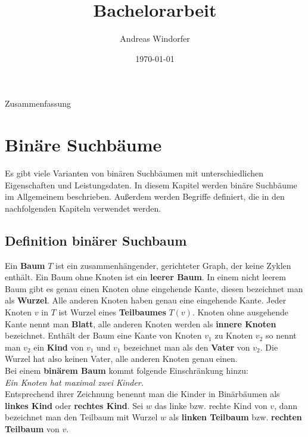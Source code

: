 \documentclass[a4paper,12pt]{article}
\title{Bachelorarbeit}
\author{

	Andreas Windorfer\\
}
\date{\today}
\begin{document}
\maketitle
\newpage
Zusammenfassung
\newpage
\tableofcontents


\newpage


\section {Binäre Suchbäume}
Es gibt viele Varianten von binären Suchbäumen mit unterschiedlichen Eigenschaften und Leistungsdaten. In diesem Kapitel werden binäre Suchbäume im Allgemeinem beschrieben. Außerdem werden Begriffe definiert, die in den nachfolgenden Kapiteln verwendet werden. \\
\subsection{Definition binärer Suchbaum}
Ein \textbf{Baum} $T$ ist ein zusammenhängender, gerichteter Graph, der keine Zyklen enthält. Ein Baum ohne Knoten ist ein \textbf{leerer Baum}. In einem nicht leerem Baum gibt es genau einen Knoten ohne eingehende Kante, diesen bezeichnet man als \textbf{Wurzel}. Alle anderen Knoten haben genau eine eingehende Kante. Jeder Knoten $v$ in $T$ ist Wurzel eines \textbf{Teilbaumes} $T(v)$. Knoten ohne ausgehende Kante nennt man \textbf{Blatt}, alle anderen Knoten werden als \textbf{innere Knoten} bezeichnet. Enthält der Baum eine Kante von Knoten $v_1$ zu Knoten $v_2$ so nennt man $v_2$ ein \textbf{Kind} von $v_1$ und $v_1$ bezeichnet man als den  \textbf{Vater} von $v_2$. Die Wurzel hat also keinen Vater, alle anderen Knoten genau einen.\\
Bei einem \textbf{binärem Baum} kommt folgende Einschränkung hinzu:  \\
\textit{Ein Knoten hat maximal zwei Kinder.}\\ 
Entsprechend ihrer Zeichnung benennt man die Kinder in Binärbäumen als \textbf{linkes Kind} oder \textbf{rechtes Kind}. Sei $w$ das linke bzw. rechte Kind von $v$, dann bezeichnet man den Teilbaum mit Wurzel $w$ als \textbf{linken Teilbaum} bzw. \textbf{rechten Teilbaum}  von $v$.  
\end{document}
